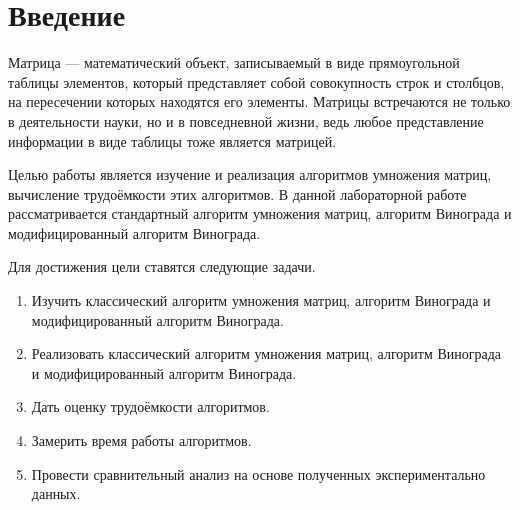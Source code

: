 \chapter*{Введение}

Матрица — математический объект, записываемый в виде прямоугольной таблицы элементов, который представляет собой совокупность строк и столбцов, на пересечении которых находятся его элементы. Матрицы встречаются не только в деятельности науки, но и в повседневной жизни, ведь любое представление информации в виде таблицы тоже является матрицей. 

Целью работы является изучение и реализация алгоритмов
умножения матриц, вычисление трудоёмкости этих алгоритмов. В данной
лабораторной работе рассматривается стандартный алгоритм умножения
матриц, алгоритм Винограда и модифицированный алгоритм Винограда.

Для достижения цели ставятся следующие задачи.

\begin{enumerate}
	\item Изучить классический алгоритм умножения матриц, алгоритм Винограда и модифицированный алгоритм Винограда.
	\item Реализовать классический алгоритм умножения матриц, алгоритм
	Винограда и модифицированный алгоритм Винограда.

	\item Дать оценку трудоёмкости алгоритмов.
	\item Замерить время работы алгоритмов.
	\item Провести сравнительный анализ на основе полученных экспериментально данных.
\end{enumerate}
